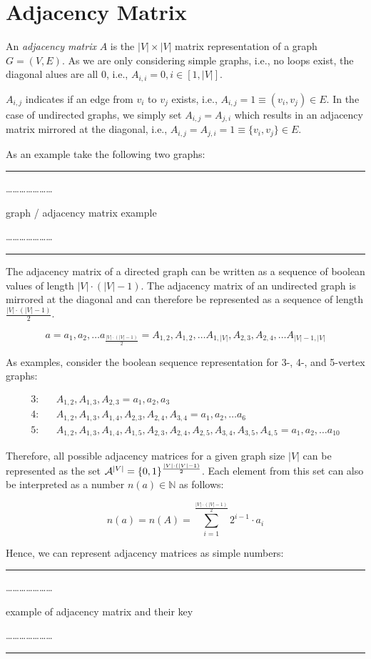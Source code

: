 \documentclass{article}
\newcommand{\eqn}[1]{
	\begin{equation*}
		#1
	\end{equation*}
}
\newcommand{\eqna}[1]{
	\begin{eqnarray*}
		#1
	\end{eqnarray*}
}
\newcommand{\missing}[1]{
	\rule{0.8\textwidth}{.5pt}

	\dots\dots\dots\dots\dots\dots\dots

	#1

	\dots\dots\dots\dots\dots\dots\dots

	\rule{0.8\textwidth}{.5pt}
}
\begin{document}
\section{Adjacency Matrix}

An \emph{adjacency matrix} $A$ is the $|V|\times|V|$ matrix representation of a graph $G=(V,E)$.
As we are only considering simple graphs, i.e., no loops exist, the diagonal alues are all 0, i.e., $A_{i,i} = 0, i \in [1, |V|]$.

$A_{i,j}$ indicates if an edge from $v_i$ to $v_j$ exists, i.e., $A_{i,j} = 1 \equiv (v_i,v_j) \in E$.
In the case of undirected graphs, we simply set $A_{i,j} = A_{j,i}$ which results in an adjacency matrix mirrored at the diagonal, i.e., $A_{i,j} = A_{j,i} = 1 \equiv \{v_i,v_j\} \in E$.

As an example take the following two graphs:

\missing{graph / adjacency matrix example}

The adjacency matrix of a directed graph can be written as a sequence of boolean values of length $|V|\cdot(|V|-1)$.
The adjacency matrix of an undirected graph is mirrored at the diagonal and can therefore be represented as a sequence of length $\frac{|V|\cdot(|V|-1)}{2}$.

\eqn{a = a_1, a_2, \dots a_{\frac{|V|\cdot(|V|-1)}{2}} = A_{1,2}, A_{1,2}, \dots A_{1,|V|}, A_{2,3}, A_{2,4}, \dots A_{|V|-1,|V|}}

As examples, consider the boolean sequence representation for 3-, 4-, and 5-vertex graphs:

\eqna{
	3: && A_{1,2}, A_{1,3}, A_{2,3} = a_1, a_2, a_3 \\
	4: && A_{1,2}, A_{1,3}, A_{1,4}, A_{2,3}, A_{2,4}, A_{3,4} = a_1, a_2, \dots a_6 \\
	5: && A_{1,2}, A_{1,3}, A_{1,4}, A_{1,5}, A_{2,3}, A_{2,4}, A_{2,5}, A_{3,4}, A_{3,5}, A_{4,5} = a_1, a_2, \dots a_{10}
}

Therefore, all possible adjacency matrices for a given graph size $|V|$ can be represented as the set ${\cal A}^{|V|} = \{0,1\}^{\frac{|V|\cdot(|V|-1)}{2}}$.
Each element from this set can also be interpreted as a number $n(a) \in \mathbb{N}$ as follows:

\eqn{n(a) = n(A) = \sum_{i=1}^{\frac{|V|\cdot(|V|-1)}{2}} 2^{i-1} \cdot a_i}

Hence, we can represent adjacency matrices as simple numbers:

\missing{example of adjacency matrix and their key}
\end{document}

